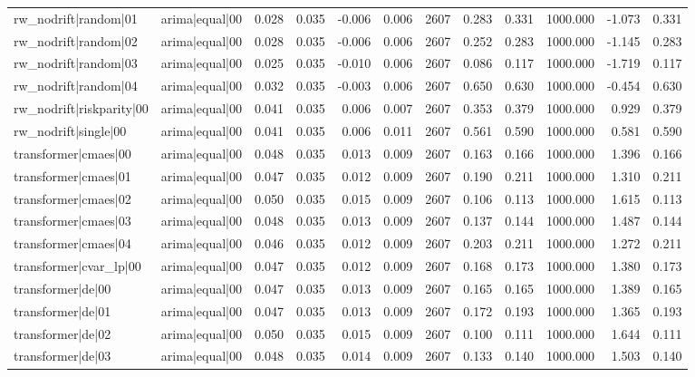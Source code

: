 \begin{table}
\begin{tabular}{llrrrrrrrrrr}
rw\_nodrift|random|01 & arima|equal|00 & 0.028 & 0.035 & -0.006 & 0.006 & 2607 & 0.283 & 0.331 & 1000.000 & -1.073 & 0.331 \\
rw\_nodrift|random|02 & arima|equal|00 & 0.028 & 0.035 & -0.006 & 0.006 & 2607 & 0.252 & 0.283 & 1000.000 & -1.145 & 0.283 \\
rw\_nodrift|random|03 & arima|equal|00 & 0.025 & 0.035 & -0.010 & 0.006 & 2607 & 0.086 & 0.117 & 1000.000 & -1.719 & 0.117 \\
rw\_nodrift|random|04 & arima|equal|00 & 0.032 & 0.035 & -0.003 & 0.006 & 2607 & 0.650 & 0.630 & 1000.000 & -0.454 & 0.630 \\
rw\_nodrift|riskparity|00 & arima|equal|00 & 0.041 & 0.035 & 0.006 & 0.007 & 2607 & 0.353 & 0.379 & 1000.000 & 0.929 & 0.379 \\
rw\_nodrift|single|00 & arima|equal|00 & 0.041 & 0.035 & 0.006 & 0.011 & 2607 & 0.561 & 0.590 & 1000.000 & 0.581 & 0.590 \\
transformer|cmaes|00 & arima|equal|00 & 0.048 & 0.035 & 0.013 & 0.009 & 2607 & 0.163 & 0.166 & 1000.000 & 1.396 & 0.166 \\
transformer|cmaes|01 & arima|equal|00 & 0.047 & 0.035 & 0.012 & 0.009 & 2607 & 0.190 & 0.211 & 1000.000 & 1.310 & 0.211 \\
transformer|cmaes|02 & arima|equal|00 & 0.050 & 0.035 & 0.015 & 0.009 & 2607 & 0.106 & 0.113 & 1000.000 & 1.615 & 0.113 \\
transformer|cmaes|03 & arima|equal|00 & 0.048 & 0.035 & 0.013 & 0.009 & 2607 & 0.137 & 0.144 & 1000.000 & 1.487 & 0.144 \\
transformer|cmaes|04 & arima|equal|00 & 0.046 & 0.035 & 0.012 & 0.009 & 2607 & 0.203 & 0.211 & 1000.000 & 1.272 & 0.211 \\
transformer|cvar\_lp|00 & arima|equal|00 & 0.047 & 0.035 & 0.012 & 0.009 & 2607 & 0.168 & 0.173 & 1000.000 & 1.380 & 0.173 \\
transformer|de|00 & arima|equal|00 & 0.047 & 0.035 & 0.013 & 0.009 & 2607 & 0.165 & 0.165 & 1000.000 & 1.389 & 0.165 \\
transformer|de|01 & arima|equal|00 & 0.047 & 0.035 & 0.013 & 0.009 & 2607 & 0.172 & 0.193 & 1000.000 & 1.365 & 0.193 \\
transformer|de|02 & arima|equal|00 & 0.050 & 0.035 & 0.015 & 0.009 & 2607 & 0.100 & 0.111 & 1000.000 & 1.644 & 0.111 \\
transformer|de|03 & arima|equal|00 & 0.048 & 0.035 & 0.014 & 0.009 & 2607 & 0.133 & 0.140 & 1000.000 & 1.503 & 0.140 \\

\end{tabular}
\end{table}
